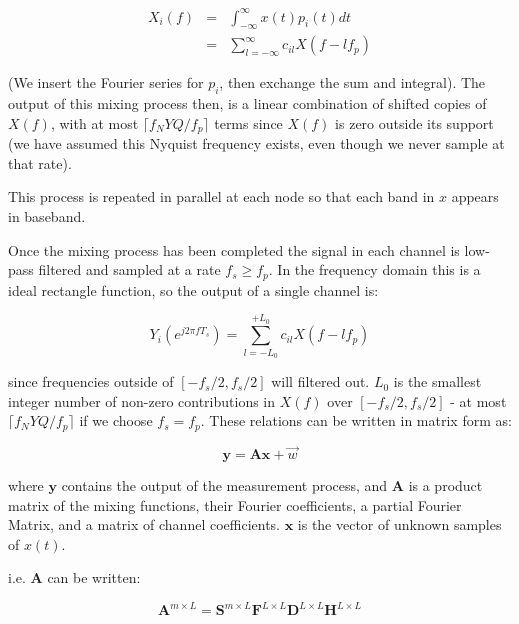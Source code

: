 \begin{align}
X_{i}\left(f\right) &=& \int_{-\infty}^{\infty} x\left(t\right) p_i\left(t\right) dt \nonumber
\\ &=& \sum_{l=-\infty}^{\infty} c_{il} X\left(f-lf_p\right)
\end{align}

(We insert the Fourier series for \(p_i\), then exchange the sum and integral). The output of this mixing process then, is a linear combination of shifted copies of \(X\left(f\right)\), with at most \(\lceil f_NYQ/f_p\rceil\) terms since \(X\left(f\right)\) is zero outside its support (we have assumed this Nyquist frequency exists, even though we never sample at that rate).

This process is repeated in parallel at each node so that each band in \(x\) appears in baseband.

Once the mixing process has been completed the signal in each channel is low-pass filtered and sampled at a rate \(f_s \geq f_p\). In the frequency domain this is a ideal rectangle function, so the output of a single channel is:

\begin{equation}
Y_i\left(e^{j 2 \pi f T_s }\right) = \sum_{l = -L_0}^{+L_0} c_{il} X\left(f-lf_p\right)
\end{equation}

since frequencies outside of \([-f_s/2, f_s/2]\) will filtered out. \(L_0\) is the smallest integer number of non-zero contributions in \(X\left(f\right)\) over \([-f_s/2, f_s/2]\) - at most \(\lceil f_NYQ/f_p\rceil\) if we choose \(f_s = f_p\). These relations can be written in matrix form as:

\begin{equation}
\textbf{y} = \textbf{A}\textbf{x} + \vec{w}
\label{system}
\end{equation}

where \(\textbf{y}\) contains the output of the measurement process, and \(\textbf{A}\) is a product matrix of the mixing functions, their Fourier coefficients, a partial Fourier Matrix, and a matrix of channel coefficients. \(\textbf{x}\) is the vector of unknown samples of \(x\left(t\right)\). 

i.e. \(\textbf{A}\) can be written: 

\begin{equation}
\textbf{A}^{m\times L} = \textbf{S}^{m\times L} \textbf{F}^{L\times L} \textbf{D}^{L \times L} \textbf{H}^{L \times L}
\end{equation}

